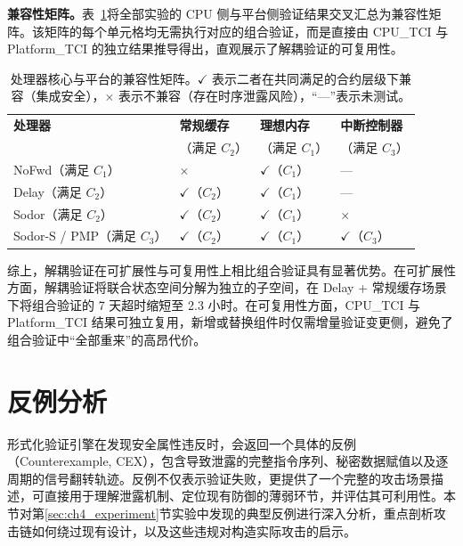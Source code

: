 \textbf{兼容性矩阵。}表~\ref{tab:ch4_compatibility}将全部实验的 CPU 侧与平台侧验证结果交叉汇总为兼容性矩阵。该矩阵的每个单元格均无需执行对应的组合验证，而是直接由 CPU\_TCI 与 Platform\_TCI 的独立结果推导得出，直观展示了解耦验证的可复用性。

\begin{table}[htb]
    \centering
    \caption{处理器核心与平台的兼容性矩阵。$\checkmark$ 表示二者在共同满足的合约层级下兼容（集成安全），$\times$ 表示不兼容（存在时序泄露风险），``—''表示未测试。}
    \label{tab:ch4_compatibility}
    \begin{tabular}{llll}
        \hline
        \textbf{处理器} & \textbf{常规缓存} & \textbf{理想内存} & \textbf{中断控制器} \\
        & （满足 $C_2$） & （满足 $C_1$） & （满足 $C_3$） \\
        \hline
        NoFwd（满足 $C_1$） & $\times$ & $\checkmark$（$C_1$） & — \\
        Delay（满足 $C_2$） & $\checkmark$（$C_2$） & $\checkmark$（$C_1$） & — \\
        Sodor（满足 $C_2$） & $\checkmark$（$C_2$） & $\checkmark$（$C_1$） & $\times$ \\
        Sodor-S / PMP（满足 $C_3$） & $\checkmark$（$C_2$） & $\checkmark$（$C_1$） & $\checkmark$（$C_3$） \\
        \hline
    \end{tabular}
\end{table}

综上，解耦验证在可扩展性与可复用性上相比组合验证具有显著优势。在可扩展性方面，解耦验证将联合状态空间分解为独立的子空间，在 Delay + 常规缓存场景下将组合验证的 7 天超时缩短至 2.3 小时。在可复用性方面，CPU\_TCI 与 Platform\_TCI 结果可独立复用，新增或替换组件时仅需增量验证变更侧，避免了组合验证中``全部重来''的高昂代价。




\section{反例分析}
\label{sec:ch4_cex_analysis}

形式化验证引擎在发现安全属性违反时，会返回一个具体的反例（Counterexample, CEX），包含导致泄露的完整指令序列、秘密数据赋值以及逐周期的信号翻转轨迹。反例不仅表示验证失败，更提供了一个完整的攻击场景描述，可直接用于理解泄露机制、定位现有防御的薄弱环节，并评估其可利用性。本节对第\ref{sec:ch4_experiment}节实验中发现的典型反例进行深入分析，重点剖析攻击链如何绕过现有设计，以及这些违规对构造实际攻击的启示。

